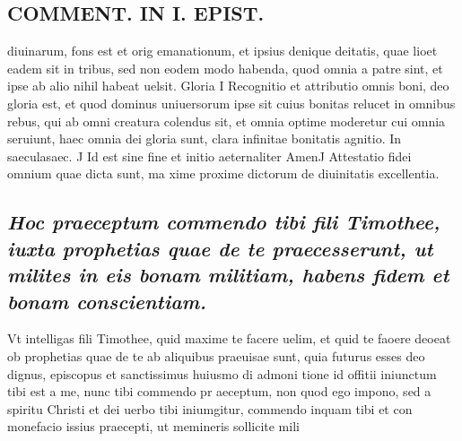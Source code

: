 \documentclass{article}
\begin{document}
\begin{pages}
\section*{COMMENT. IN I. EPIST. }
\marginpar{[ p.38 ]}\pstart diuinarum, fons est et orig emanationum, et ipsius denique deitatis, quae lioet eadem sit in tribus, sed non eodem modo habenda, quod omnia a patre sint, et ipse ab alio nihil habeat uelsit.  \pend\pstart Gloria I Recognitio et attributio omnis boni, deo gloria est, et quod dominus uniuersorum ipse sit cuius bonitas relucet in omnibus rebus, qui ab omni creatura colendus sit, et omnia optime moderetur cui omnia seruiunt, haec omnia dei gloria sunt, clara infinitae bonitatis agnitio.  \pend\pstart In saeculasaec. J Id est sine fine et initio aeternaliter AmenJ Attestatio fidei omnium quae dicta sunt, ma xime proxime dictorum de diuinitatis excellentia.  \pend
{}
{}
\subsection*{\textit{Hoc praeceptum commendo tibi fili Timothee, iuxta prophetias quae de te praecesserunt, ut milites in eis bonam militiam, habens fidem et bonam conscientiam. }}\pstart Vt intelligas fili Timothee, quid maxime te facere uelim, et quid te faoere deoeat ob prophetias quae de te ab aliquibus praeuisae sunt, quia futurus esses deo dignus, episcopus et sanctissimus huiusmo di admoni tione id offitii iniunctum tibi est a me, nunc tibi commendo pr aeceptum, non quod ego impono, sed a spiritu Christi et dei uerbo tibi iniumgitur, commendo inquam tibi et con monefacio issius praecepti, ut memineris sollicite mili\pend

\end{pages}
\end{document}

